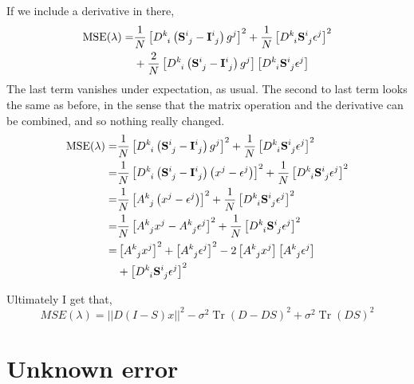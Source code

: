 \documentclass[11pt]{article}
\DeclareMathOperator{\Tr}{Tr}
\begin{document}
If we include a derivative in there,
\begin{align}
    \textrm{MSE}(\lambda) =& \frac{1}{N} \left[ D\indices{^k_i} \left(\mathbf{S}\indices{^i_j} -\mathbf{I}\indices{^i_j} \right) g^j  \right]^2  + \frac{1}{N} \left[ D\indices{^k_i} \mathbf{S}\indices{^i_j} \epsilon^j \right]^2\\
    & +\frac{2}{N} \left[ D\indices{^k_i} \left(\mathbf{S}\indices{^i_j} -\mathbf{I}\indices{^i_j} \right) g^j  \right] \left[ D\indices{^k_i} \mathbf{S}\indices{^i_j} \epsilon^j \right]
\end{align}
The last term vanishes under expectation, as usual. The second to last term looks the same as before, in the sense that the matrix operation and the derivative can be combined, and so nothing really changed.
\begin{align}
    \textrm{MSE}(\lambda) =& \frac{1}{N} \left[ D\indices{^k_i} \left(\mathbf{S}\indices{^i_j} -\mathbf{I}\indices{^i_j} \right) g^j  \right]^2  + \frac{1}{N} \left[ D\indices{^k_i} \mathbf{S}\indices{^i_j} \epsilon^j \right]^2 \\ \nonumber
    =& \frac{1}{N} \left[ D\indices{^k_i} \left(\mathbf{S}\indices{^i_j} -\mathbf{I}\indices{^i_j} \right) \left(x^j-\epsilon^j\right)  \right]^2  + \frac{1}{N} \left[ D\indices{^k_i} \mathbf{S}\indices{^i_j} \epsilon^j \right]^2\\
    =& \frac{1}{N}\left[ A\indices{^k_j} \left(x^j-\epsilon^j\right) \right]^2 + \frac{1}{N} \left[ D\indices{^k_i} \mathbf{S}\indices{^i_j} \epsilon^j \right]^2 \\
    =& \frac{1}{N}\left[ A\indices{^k_j} x^j-A\indices{^k_j}\epsilon^j \right]^2 + \frac{1}{N} \left[ D\indices{^k_i} \mathbf{S}\indices{^i_j} \epsilon^j \right]^2 \\
    =& \left[ A\indices{^k_j} x^j\right]^2 + \left[ A\indices{^k_j}\epsilon^j \right]^2 - 2 \left[ A\indices{^k_j} x^j\right]\left[ A\indices{^k_j}\epsilon^j \right] \\ \nonumber
    & +  \left[ D\indices{^k_i} \mathbf{S}\indices{^i_j} \epsilon^j \right]^2
\end{align}

Ultimately I get that,
\begin{equation}
    MSE(\lambda) = || D(I-S)x ||^2 - \sigma^2 \Tr \left(D - DS \right)^2 + \sigma^2 \Tr (DS)^2 
\end{equation}

%
\section{Unknown error} \label{sec:unknown_error}
%
\end{document}
